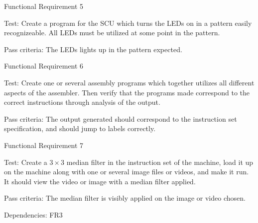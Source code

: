 {\sc Functional Requirement 5}
\begin{Test}
  {\em \FRV}
  
  {\sc Test:} Create a program for the \ac{SCU} which turns the \acp{LED} on in
  a pattern easily recognizeable. All \acp{LED} must be utilized at some point
  in the pattern.

  {\sc Pass criteria:} The LEDs lights up in the pattern expected.
\end{Test}

\newpage %
{\sc Functional Requirement 6}
\begin{Test}
  {\em \FRVI}
  
  {\sc Test:} Create one or several assembly programs which together utilizes
  all different aspects of the assembler. Then verify that the programs made
  correspond to the correct instructions through analysis of the output.

  {\sc Pass criteria:} The output generated should correspond to the instruction
  set specification, and should jump to labels correctly.
\end{Test}

{\sc Functional Requirement 7}
\begin{Test}
  {\em \FRVII}
  
  {\sc Test:} Create a $3\times3$ median filter in the instruction set of the
  machine, load it up on the machine along with one or several image files or
  videos, and make it run. It should view the video or image with a median
  filter applied.

  {\sc Pass criteria:} The median filter is visibly applied on the image or
  video chosen.

  {\sc Dependencies:} FR3
\end{Test}

